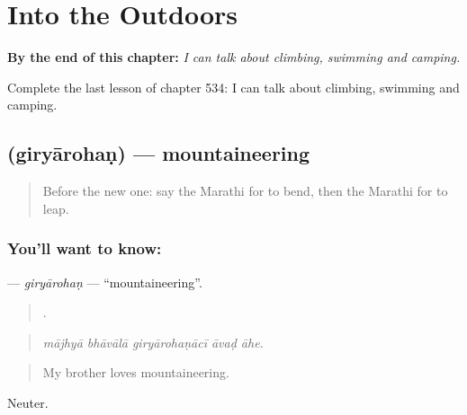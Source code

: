 
\chapter{Into the Outdoors}
\label{ch:mr-into-the-outdoors}

\begin{chapteropening}
\textbf{By the end of this chapter:} \emph{I can talk about climbing, swimming and camping.}

Complete the last lesson of chapter 534: I can talk about climbing, swimming and camping.
\end{chapteropening}

\section[\texorpdfstring{\mr{गिर्यारोहण} (giryārohaṇ)}{गिर्यारोहण (giryārohaṇ)}]{ (giryārohaṇ) — mountaineering}

\label{lesson:MR-C534-giryarohan}



\begin{quote}
Before the new one: say the Marathi for to bend, then the Marathi for to leap.
\end{quote}

\subsection*{You'll want to know: }
\textbf{} — \emph{giryārohaṇ} — \textquotedblleft{}mountaineering\textquotedblright{}.

\begin{quote}
    .
\end{quote}

\begin{quote}
\emph{mājhyā bhāvālā giryārohaṇācī āvaḍ āhe.}
\end{quote}

\begin{quote}
My brother loves mountaineering.
\end{quote}

Neuter.

